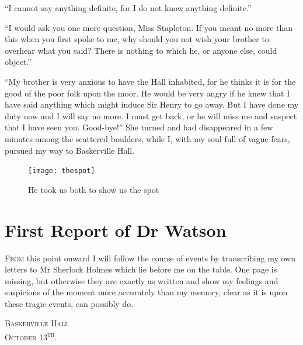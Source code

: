 \documentclass[paper=5.5in:8.5in,BCOR=7mm,twoside,DIV=calc,12pt,usegeometry,openany,chapterprefix,endperiod,headings=big]{scrbook} %
\begin{document}
\enquote{I cannot say anything definite, for I do not know anything definite.}

\enquote{I would ask you one more question, Miss Stapleton. If you meant no more than this when you first spoke to me, why should you not wish your brother to overhear what you said? There is nothing to which he, or anyone else, could object.}

\enquote{My brother is very anxious to have the Hall inhabited, for he thinks it is for the good of the poor folk upon the moor. He would be very angry if he knew that I have said anything which might induce Sir Henry to go away. But I have done my duty now and I will say no more. I must get back, or he will miss me and suspect that I have seen you. Good-bye!} She turned and had disappeared in a few minutes among the scattered boulders, while I, with my soul full of vague fears, pursued my way to Baskerville Hall.
\clearpage
\vfill
\begin{figure}[tbph]
\centering
\texttt{[image: thespot]}
\caption{He took us both to show us the spot}
\end{figure}
\vfill
\thispagestyle{empty}
\clearpage

\chapter{First Report of Dr Watson}
\lettrine[lines=1]{F}{rom} this point onward I will follow the course of events by transcribing my own letters to Mr Sherlock Holmes which lie before me on the table. One page is missing, but otherwise they are exactly as written and show my feelings and suspicions of the moment more accurately than my memory, clear as it is upon these tragic events, can possibly do.\\

\hfill\begin{minipage}{0.5\linewidth}\textsc{Baskerville Hall\\October 13\textsuperscript{th}.}\end{minipage}
\end{document}
